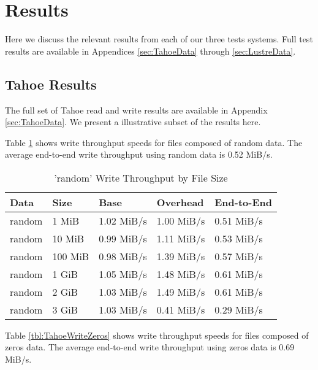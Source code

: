 \documentclass[11pt]{article}
\begin{document}
\section{Results}

Here we discuss the relevant results from each of our three tests
systems. Full test results are available in Appendices
\ref{sec:TahoeData} through \ref{sec:LustreData}.

\subsection{Tahoe Results}

The full set of Tahoe read and write results are available in Appendix
\ref{sec:TahoeData}. We present a illustrative subset of the results
here.

Table \ref{tbl:TahoeWriteRandom} shows write throughput speeds for files
composed of random data. The average end-to-end write throughput using
random data is 0.52 MiB/s.

\begin{table}
  \begin{center}
    \begin{tabularx}{\textwidth}{|X|X|X|X|X|}
      \hline
      {\bf Data} & {\bf Size} & {\bf Base} & {\bf Overhead} & {\bf End-to-End} \\ \hline
      random & 1 MiB & 1.02 MiB/s & 1.00 MiB/s & 0.51 MiB/s \\ \hline
      random & 10 MiB & 0.99 MiB/s & 1.11 MiB/s & 0.53 MiB/s \\ \hline
      random & 100 MiB & 0.98 MiB/s & 1.39 MiB/s & 0.57 MiB/s \\ \hline
      random & 1 GiB & 1.05 MiB/s & 1.48 MiB/s & 0.61 MiB/s \\ \hline
      random & 2 GiB & 1.03 MiB/s & 1.49 MiB/s & 0.61 MiB/s \\ \hline
      random & 3 GiB & 1.03 MiB/s & 0.41 MiB/s & 0.29 MiB/s \\ \hline
    \end{tabularx}
    \caption{'random' Write Throughput by File Size}
    \label{tbl:TahoeWriteRandom}
  \end{center}
\end{table}

Table \ref{tbl:TahoeWriteZeros} shows write throughput speeds for files
composed of zeros data. The average end-to-end write throughput using
zeros data is 0.69 MiB/s.
\end{document}
